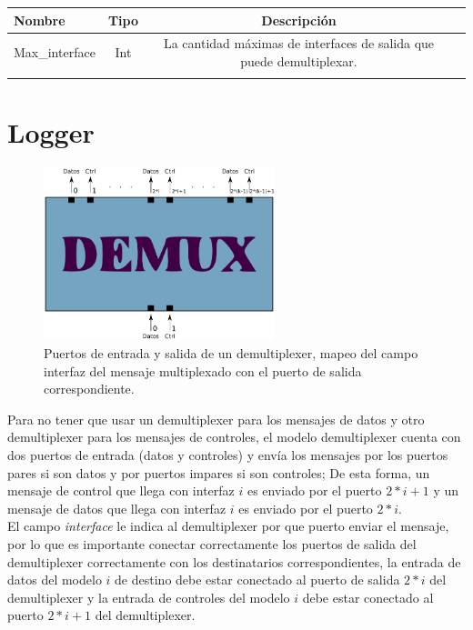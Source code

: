 \documentclass[10pt,a4paper]{article}
\begin{document}
\begin{tabular}{|l|c|c|c|}
  \hline
  Nombre & Tipo & Descripción \\
  \hline
  Max_interface & Int & La cantidad máximas de interfaces de salida que puede demultiplexar. \\
  \hline
  \label{table: parameters demultiplexer}
  \caption{Parametros del modelo demultiplexer}
\end{tabular}

\section{Logger}

\begin{figure}[htbp]
    \centering
    \includegraphics[width = 0.6\textwidth]{img/png/demultiplexer.png}
    \caption{Puertos de entrada y salida de un demultiplexer, mapeo del campo interfaz del mensaje multiplexado con el puerto de salida correspondiente.}
    \label{figure: demultiplexer}
\end{figure}

Para no tener que usar un demultiplexer para los mensajes de datos y otro demultiplexer para los mensajes de controles, el modelo demultiplexer cuenta con dos puertos de entrada (datos y controles) y envía los mensajes por los puertos pares si son datos y por puertos impares si son controles; De esta forma, un mensaje de control que llega con interfaz $i$ es enviado por el puerto $2*i+1$ y un mensaje de datos que llega con interfaz $i$ es enviado por el puerto $2*i$. \\

El campo \textit{interface} le indica al demultiplexer por que puerto enviar el mensaje, por lo que es importante conectar correctamente los puertos de salida del demultiplexer correctamente con los destinatarios correspondientes, la entrada de datos del modelo $i$ de destino debe estar conectado al puerto de salida $2*i$ del demultiplexer y la entrada de controles del modelo $i$ debe estar conectado al puerto $2*i+1$ del demultiplexer. \\
\end{document}

